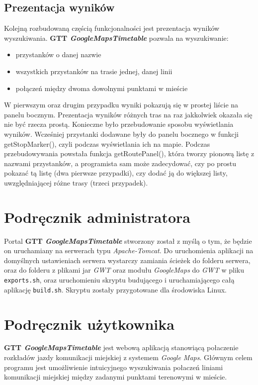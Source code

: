\documentclass[a4paper,12pt]{article}
\begin{document}
\subsection{Prezentacja wyników}
Kolejną rozbudowaną częścią funkcjonalności jest prezentacja wyników wyszukiwania.
\textbf{GTT \emph{GoogleMapsTimetable}} pozwala na wyszukiwanie:
\begin{itemize}
\item przystanków o danej nazwie
\item wszystkich przystanków na trasie jednej, danej linii
\item połączeń między dwoma dowolnymi punktami w mieście
\end{itemize}
W pierwszym oraz drugim przypadku wyniki pokazują się w prostej liście na panelu bocznym.
Prezentacja wyników różnych tras na raz jakkolwiek okazała się nie być rzecza prostą.
Konieczne było przebudowanie sposobu wyświetlania wyników. Wcześniej przystanki dodawane
były do panelu bocznego w funkcji getStopMarker(), czyli podczas wyświetlania ich na mapie.
Podczas przebudowywania powstała funkcja getRoutePanel(), która tworzy pionową listę
z nazwami przystanków, a programista sam może zadecydować, czy po prostu pokazać tą listę
(dwa pierwsze przypadki), czy dodać ją do większej listy, uwzględniającej różne trasy
(trzeci przypadek).

\section{Podręcznik administratora}
Portal \textbf{GTT \emph{GoogleMapsTimetable}} stworzony został z myślą o tym,
że będzie on uruchamiany na serwerach typu \emph{Apache-Tomcat}. Do uruchomienia
aplikacji na domyślnych ustawieniach serwera wystarczy zamiania ścieżek do
folderu serwera, oraz do folderu z plikami jar \emph{GWT} oraz modułu \emph{GoogleMaps}
do \emph{GWT} w pliku \texttt{exports.sh}, oraz uruchomieniu skryptu budującego i
uruchamiającego całą aplikację \texttt{build.sh}. Skryptu zostały przygotowane
dla środowiska Linux.

\section{Podręcznik użytkownika}

 \textbf{GTT \emph{GoogleMapsTimetable}} jest webową aplikacją stanowiącą
 połaczenie rozkładów jazdy komunikacji miejskiej z systemem \emph{Google
 Maps}. Głównym celem programu jest umożliwienie intuicyjnego wyszukiwania
 połaczeń liniami komunikacji miejskiej między zadanymi punktami terenowymi w
 mieście. 
 
\end{document}
